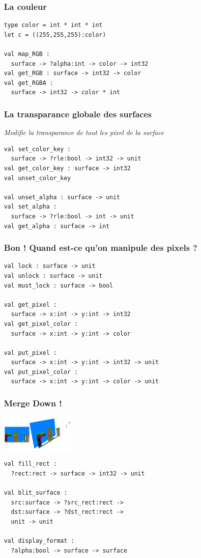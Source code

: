 \begin{frame}[fragile]
	\frametitle{La couleur}
	\begin{lstlisting}
type color = int * int * int
let c = ((255,255,255):color)

val map_RGB : 
  surface -> ?alpha:int -> color -> int32
val get_RGB : surface -> int32 -> color
val get_RGBA : 
  surface -> int32 -> color * int
	\end{lstlisting}
\end{frame}

\begin{frame}[fragile]
	\frametitle{La transparance \textbf{globale} des surfaces}
	\textit{Modifie la transparance de tout les pixel de la surface}
	\begin{lstlisting}
val set_color_key : 
  surface -> ?rle:bool -> int32 -> unit
val get_color_key : surface -> int32
val unset_color_key

val unset_alpha : surface -> unit
val set_alpha : 
  surface -> ?rle:bool -> int -> unit
val get_alpha : surface -> int
	\end{lstlisting}
\end{frame}

\begin{frame}[fragile]
	\frametitle{\og{}Bon ! Quand est-ce qu'on manipule des pixels ?\fg}
	\begin{lstlisting}
val lock : surface -> unit
val unlock : surface -> unit
val must_lock : surface -> bool

val get_pixel : 
  surface -> x:int -> y:int -> int32
val get_pixel_color : 
  surface -> x:int -> y:int -> color

val put_pixel : 
  surface -> x:int -> y:int -> int32 -> unit
val put_pixel_color : 
  surface -> x:int -> y:int -> color -> unit
	\end{lstlisting}
\end{frame}

\begin{frame}[fragile]
	\frametitle{\og{}Merge Down !\fg}
	\begin{center}
		\includegraphics[width=3.6cm]{pics/surfacesMerge.png}
	\end{center}
	\begin{lstlisting}
val fill_rect : 
  ?rect:rect -> surface -> int32 -> unit

val blit_surface : 
  src:surface -> ?src_rect:rect -> 
  dst:surface -> ?dst_rect:rect -> 
  unit -> unit

val display_format : 
  ?alpha:bool -> surface -> surface
	\end{lstlisting}
\end{frame}

